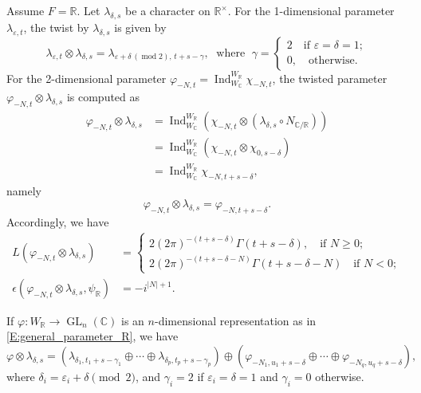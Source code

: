 \documentclass[11pt]{amsart}
\theoremstyle{plain}
\theoremstyle{definition}
\numberwithin{equation}{section}
\newcommand{\C}{\mathbb C}
\newcommand{\R}{\mathbb{R}}
\newcommand{\la}{\lambda}
\newcommand{\ep}{\varepsilon}
\newcommand{\Ind}{\operatorname{Ind}}
\newcommand{\GL}{\operatorname{GL}}
\begin{document}
Assume $F=\R$. Let $\la_{\delta, s}$ be a character on $\R^\times$. For
the 1-dimensional parameter $\la_{\ep,t}$, the twist by $\la_{\delta,s}$ is given by
\[
\la_{\ep, t}\otimes\la_{\delta,s}=
\la_{\ep+\delta\,(\operatorname{mod} 2),\, t+s-\gamma},
\;\text{ where }\;
\gamma=\begin{cases}2\quad\text{if $\ep=\delta=1$};\\
0,\quad\text{otherwise}.
\end{cases}
\]
For the 2-dimensional parameter
$\varphi_{-N,t}=\Ind_{W_\C}^{W_\R}\chi_{-N, t}$, the twisted parameter
$\varphi_{-N,t}\otimes\la_{\delta,s}$ is computed as
\begin{align*}
\varphi_{-N,t}\otimes\la_{\delta,s}
&=\Ind_{W_\C}^{W_\R}(\chi_{-N, t}\otimes(\la_{\delta, s}\circ
N_{\C/\R}))\\
&=\Ind_{W_\C}^{W_\R}(\chi_{-N, t}\otimes\chi_{0, s-\delta})\\
&=\Ind_{W_\C}^{W_\R}\chi_{-N, t+s-\delta},
\end{align*}
namely
\[
\varphi_{-N, t}\otimes\la_{\delta, s}=\varphi_{-N, t+s-\delta}.
\]
Accordingly, we have
\begin{align}
\label{E:GL(2)xGL(1)_L}L(\varphi_{-N, t}\otimes\la_{\delta, s})&=\begin{cases}
2(2\pi)^{-(t+s-\delta)}\Gamma(t+s-\delta),\quad\text{if $N\geq 0$};\\
2(2\pi)^{-(t+s-\delta-N)}\Gamma(t+s-\delta-N) \quad\text{if $N<0$};
\end{cases}\\
\label{E:GL(2)xGL(2)_ep}\epsilon(\varphi_{-N, t}\otimes\la_{\delta, s}, \psi_\R)&=-i^{|N|+1}.
\end{align}

If $\varphi:W_\R\rightarrow\GL_n(\C)$ is an $n$-dimensional
representation as
in \eqref{E:general_parameter_R}, we have
\[
\varphi\otimes\la_{\delta,  s}=
\left(\la_{\delta_1,t_1+s-\gamma_1} \oplus\cdots\oplus\la_{\delta_p,t_p+s-\gamma_p}\right)\oplus
\left(\varphi_{-N_1,u_1+s-\delta}\oplus\cdots\oplus\varphi_{-N_q, u_q+s-\delta}\right),
\]
where $\delta_i=\ep_i+\delta\pmod{2}$, and $\gamma_i=2$ if
$\ep_i=\delta=1$ and $\gamma_i=0$ otherwise.
\end{document}

